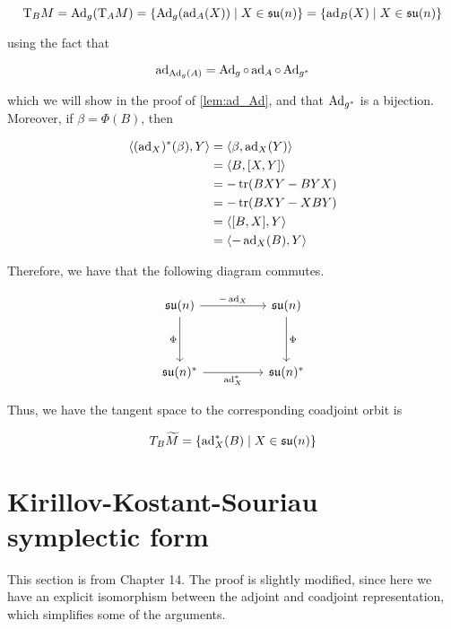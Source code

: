 \documentclass{article}
\newcommand{\su}{\mathfrak{su}}
\renewcommand{\tilde}{\widetilde}
\begin{document}
\begin{equation}
    \label{eq:tangent-space}
    \TT_B M = \Ad_g(\TT_A M) = \left\{\Ad_g(\ad_A(X)) \mid X \in \su(n)\right\} = \left\{\ad_B(X) \mid X \in \su(n)\right\}
\end{equation}

using the fact that

\[\operatorname{ad}_{\operatorname{Ad}_g(A)} = \operatorname{Ad}_g \circ \operatorname{ad}_A \circ \operatorname{Ad}_{g^*}\]

which we will show in the proof of \cref{lem:ad_Ad}, and that \(\operatorname{Ad}_{g^*}\) is a bijection. Moreover, if \(\beta= \Phi(B)\), then

\begin{align*}
    \left\langle (\operatorname{ad}_X)^*(\beta), Y \right\rangle &= \left\langle \beta, \operatorname{ad}_X(Y) \right\rangle \\
    &= \left\langle B, [X, Y] \right\rangle \\
    &= -\tr(BXY - BYX) \\
    &= -\tr(BXY - XBY) \\
    &= \left\langle [B, X], Y \right\rangle \\
    &= \left\langle -\operatorname{ad}_X(B), Y \right\rangle
\end{align*}

Therefore, we have that the following diagram commutes.

\[\begin{tikzcd}
	{\su(n)} && {\su(n)} \\
	\\
	{\su(n)^*} && {\su(n)^*}
	\arrow["\Phi"', from=1-1, to=3-1]
	\arrow["\Phi", from=1-3, to=3-3]
	\arrow["{-\ad_X}", from=1-1, to=1-3]
	\arrow["{\ad_X^*}"', from=3-1, to=3-3]
\end{tikzcd}\]

Thus, we have the tangent space to the corresponding coadjoint orbit is

\[T_B \tilde M = \left\{\ad_X^*(B) \mid X \in \su(n)\right\}\]

\section{Kirillov-Kostant-Souriau symplectic form}

\label{sec:kks}

This section is from \cite{marsden_ratiu} Chapter 14. The proof is slightly modified, since here we have an explicit isomorphism between the adjoint and coadjoint representation, which simplifies some of the arguments.
\end{document}
